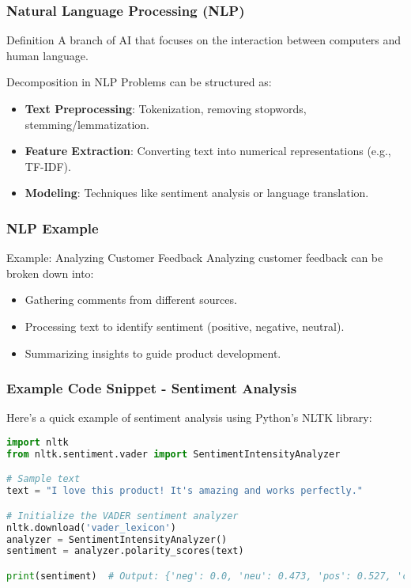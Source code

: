 \documentclass[aspectratio=169]{beamer}
\begin{document}
\begin{frame}
    \frametitle{Natural Language Processing (NLP)}
    \begin{block}{Definition}
        A branch of AI that focuses on the interaction between computers and human language.
    \end{block}
    \begin{block}{Decomposition in NLP}
        Problems can be structured as:
        \begin{itemize}
            \item \textbf{Text Preprocessing}: Tokenization, removing stopwords, stemming/lemmatization.
            \item \textbf{Feature Extraction}: Converting text into numerical representations (e.g., TF-IDF).
            \item \textbf{Modeling}: Techniques like sentiment analysis or language translation.
        \end{itemize}
    \end{block}
\end{frame}

\begin{frame}
    \frametitle{NLP Example}
    \begin{block}{Example: Analyzing Customer Feedback}
        Analyzing customer feedback can be broken down into:
        \begin{itemize}
            \item Gathering comments from different sources.
            \item Processing text to identify sentiment (positive, negative, neutral).
            \item Summarizing insights to guide product development.
        \end{itemize}
    \end{block}
\end{frame}

\begin{frame}[fragile]
    \frametitle{Example Code Snippet - Sentiment Analysis}
    Here's a quick example of sentiment analysis using Python's NLTK library:
    \begin{lstlisting}[language=Python]
import nltk
from nltk.sentiment.vader import SentimentIntensityAnalyzer

# Sample text
text = "I love this product! It's amazing and works perfectly."

# Initialize the VADER sentiment analyzer
nltk.download('vader_lexicon')
analyzer = SentimentIntensityAnalyzer()
sentiment = analyzer.polarity_scores(text)

print(sentiment)  # Output: {'neg': 0.0, 'neu': 0.473, 'pos': 0.527, 'compound': 0.8402}
    \end{lstlisting}
\end{frame}
\end{document}
